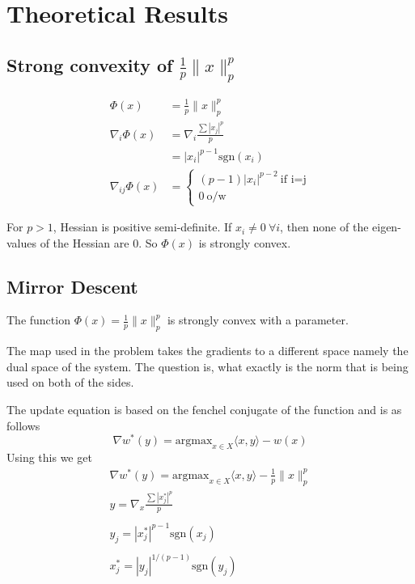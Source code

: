 \section*{Theoretical Results}

\subsection*{Strong convexity of $\frac{1}{p} \| x \|_p^p$}
\begin{align*}
\Phi(x) &= \frac{1}{p} \| x \|_p^p \\
\nabla_i \Phi(x) &= \nabla_i \frac{\sum |x_j|^p}{p} \\
&= |x_i|^{p-1} \text{sgn}(x_i) \\
\nabla_{ij} \Phi(x) &= \begin{cases}(p-1)|x_i|^{p-2}\ \text{if i=j}\\ 0\ \text{o/w}\end{cases}
\end{align*}

For $p>1$, Hessian is positive semi-definite. If $x_i \ne 0\ \forall i$, then none of the eigen-values of the Hessian are 0. So $\Phi(x)$ is strongly convex.

\subsection*{Mirror Descent}
The function $\Phi(x) = \frac{1}{p} \| x \|_p^p$ is strongly convex with a parameter.

The map used in the problem takes the gradients to a different space namely the dual space of the system. 
The question is, what exactly is the norm that is being used on both of the sides.

The update equation is based on the fenchel conjugate of the function and is as follows
\begin{equation}
    \nabla w^*(y) = \text{argmax}_{x \in X} \langle x, y \rangle - w(x)
\end{equation}
Using this we get 
\begin{gather*}
    \nabla w^*(y) = \text{argmax}_{x \in X} \langle x, y \rangle - \frac{1}{p} \| x \|_p^p 
    \\
    y = \nabla_x \frac{\sum |x^*_j|^p}{p} \\
    \\
    y_j = |x^*_j|^{p-1} \text{sgn}(x_j) \\
    \\
    x_j^* = |y_j|^{1/(p-1)} \text{sgn}(y_j)
\end{gather*}

